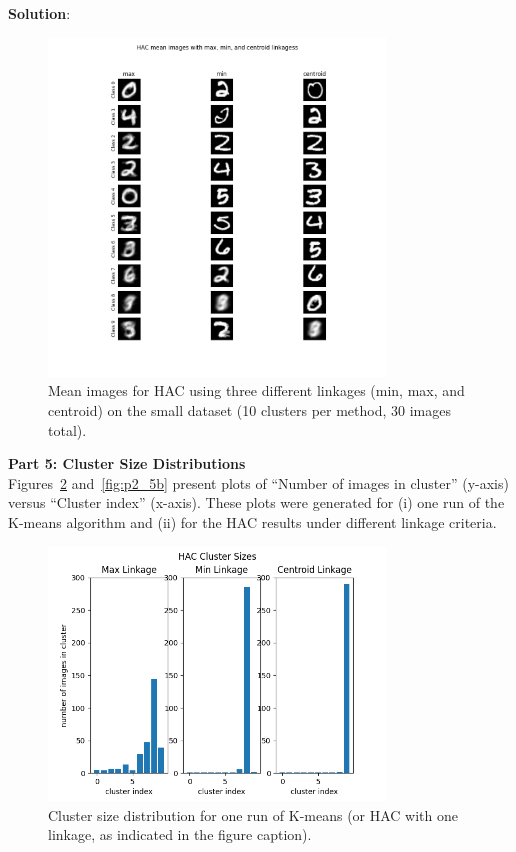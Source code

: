 \documentclass[submit]{../harvardml}
\newenvironment{solution}{
    \vspace{2mm}
    \color{blue}\noindent\textbf{Solution}:
}{}
\begin{document}
\begin{solution}
\begin{figure}[h!]
  \centering
  \includegraphics[width=0.8\textwidth]{img_output/p2.4.png}
  \caption{Mean images for HAC using three different linkages (min, max, and centroid) on the small dataset (10 clusters per method, 30 images total).}
  \label{fig:p2_4}
\end{figure}

\medskip
\textbf{Part 5: Cluster Size Distributions}\\
Figures~\ref{fig:p2_5a} and~\ref{fig:p2_5b} present plots of ``Number of images in cluster'' (y-axis) versus ``Cluster index'' (x-axis). These plots were generated for (i) one run of the K-means algorithm and (ii) for the HAC results under different linkage criteria. 

\begin{figure}[h!]
  \centering
  \includegraphics[width=0.8\textwidth]{img_output/p2.5a.png}
  \caption{Cluster size distribution for one run of K-means (or HAC with one linkage, as indicated in the figure caption).}
  \label{fig:p2_5a}
\end{figure}


\end{solution}
\end{document}
